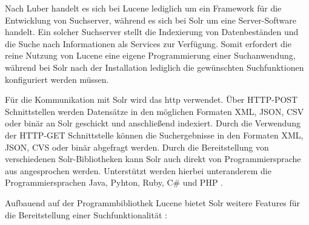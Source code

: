 Nach Luber \cite{StefanLuber.2018b} handelt es sich bei Lucene lediglich um ein Framework für die Entwicklung von Suchserver, während es sich bei Solr um eine Server-Software handelt. Ein solcher Suchserver stellt die Indexierung von Datenbeständen und die Suche nach Informationen als Services zur Verfügung. Somit erfordert die reine Nutzung von Lucene eine eigene Programmierung einer Suchanwendung, während bei Solr nach der Installation lediglich die gewünschten Suchfunktionen konfiguriert werden müssen.

Für die Kommunikation mit Solr wird das \gls{http} verwendet. Über HTTP-POST Schnittstellen werden Datensätze in den möglichen Formaten XML, JSON, CSV oder binär an Solr geschickt und anschließend indexiert. Durch die Verwendung der HTTP-GET Schnittstelle können die Suchergebnisse in den Formaten XML, JSON, CVS oder binär abgefragt werden. Durch die Bereitstellung von verschiedenen Solr-Bibliotheken kann Solr auch direkt von Programmiersprache aus angesprochen werden. Unterstützt werden hierbei unteranderem die Programmiersprachen Java, Pyhton, Ruby, C\# und PHP \cite{SematextGroup.2021}.

Aufbauend auf der Programmbibliothek Lucene bietet Solr weitere Features für die Bereitstellung einer Suchfunktionalität \cite{ApacheSoftwareFoundation.2021b}:

